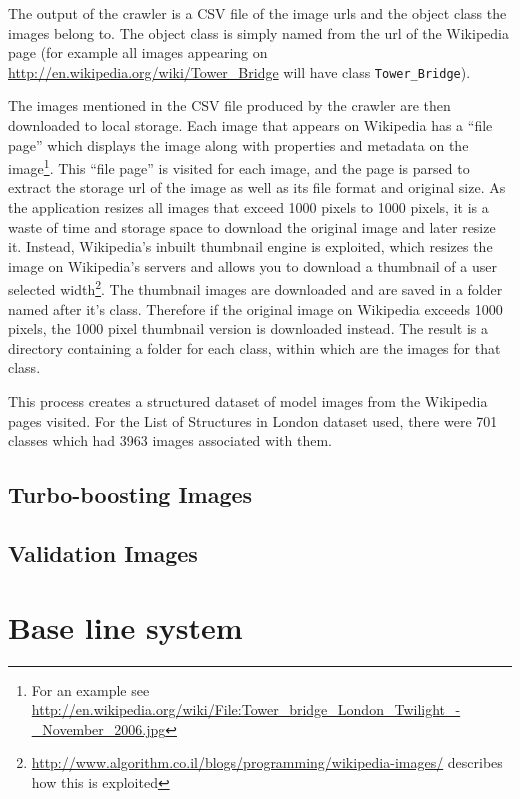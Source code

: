 \documentclass[11pt, onecolumn, a4paper, final]{report} %
\begin{document}
The output of the crawler is a CSV file of the image urls and the object class the images belong to. The object class is simply named from the url of the Wikipedia page (for example all images appearing on \url{http://en.wikipedia.org/wiki/Tower_Bridge} will have class \lstinline!Tower_Bridge!).

The images mentioned in the CSV file produced by the crawler are then downloaded to local storage. Each image that appears on Wikipedia has a ``file page'' which displays the image along with properties and metadata on the image\footnote{For an example see \url{http://en.wikipedia.org/wiki/File:Tower_bridge_London_Twilight_-_November_2006.jpg}}. This ``file page'' is visited for each image, and the page is parsed to extract the storage url of the image as well as its file format and original size. As the application resizes all images that exceed 1000 pixels to 1000 pixels, it is a waste of time and storage space to download the original image and later resize it. Instead, Wikipedia's inbuilt thumbnail engine is exploited, which resizes the image on Wikipedia's servers and allows you to download a thumbnail of a user selected width\footnote{\url{http://www.algorithm.co.il/blogs/programming/wikipedia-images/} describes how this is exploited}. The thumbnail images are downloaded and are saved in a folder named after it's class. Therefore if the original image on Wikipedia exceeds 1000 pixels, the 1000 pixel thumbnail version is downloaded instead. The result is a directory containing a folder for each class, within which are the images for that class.

This process creates a structured dataset of model images from the Wikipedia pages visited. For the List of Structures in London dataset used, there were 701 classes which had 3963 images associated with them.


\section{Turbo-boosting Images}
\label{sec:turboimages}

\section{Validation Images}
\label{sec:validationimages}


\chapter{Base line system}
\label{chpt:system}
\end{document}
